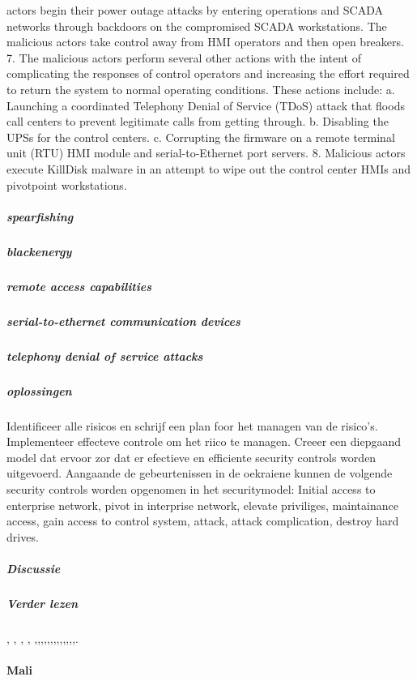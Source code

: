 actors begin their power outage attacks by entering
operations and SCADA networks through backdoors on
the compromised SCADA workstations. The malicious
actors take control away from HMI operators and then
open breakers.
7. The malicious actors perform several other actions with
the intent of complicating the responses of control
operators and increasing the effort required to return the
system to normal operating conditions. These actions
include:
a. Launching a coordinated Telephony Denial of
Service (TDoS) attack that floods call centers to
prevent legitimate calls from getting through.
b. Disabling the UPSs for the control centers.
c. Corrupting the firmware on a remote terminal unit
(RTU) HMI module and serial-to-Ethernet port
servers.
8. Malicious actors execute KillDisk malware in an
attempt to wipe out the control center HMIs and pivotpoint workstations.
\cite{Whitehead2017ukrainepoweroutage}
\cite{boozallen2016lightwentout}
\subparagraph{spearfishing}
\subparagraph{blackenergy}
\subparagraph{remote access capabilities}
\subparagraph{serial-to-ethernet communication devices}
\subparagraph{telephony denial of service attacks}
\subparagraph{oplossingen}
Identificeer alle risicos en schrijf een plan foor het managen van de risico's.
Implementeer  effecteve controle  om het riico te managen.
Creeer een diepgaand model dat ervoor zor dat er efectieve en efficiente security controls worden uitgevoerd.
Aangaande de gebeurtenissen in de oekraiene kunnen de volgende security controls worden opgenomen in het securitymodel: Initial access to enterprise network, pivot in interprise network, elevate priviliges, maintainance access, gain access to control system, attack, attack complication, destroy hard drives.
\cite{Whitehead2017ukrainepoweroutage}
\subparagraph{Discussie}
\subparagraph{Verder lezen}
\cite{shahzad2014ScadaProtocolsPollingScenario},
\cite{grammatikis2019AttackIEC6087505104},
\cite{2017win32industroyer},
\cite{yadav2020reviewScadaArchitecture},
\cite{arrizabalaga2020surveyiiotProtocols},\cite{fauri2017EncryptionICS},\cite{resch31102019IEC62351secureCommunication},\cite{levalle2020FuzzingICSProtocols},\cite{blackhatusa2017},\cite{blackhatusa2017},\cite{abb30062017crashoverridenotification},\cite{spinner2018crashoverrideiot},\cite{njccicthreat08102017crashovverrideprofile},\cite{slowikvb2018crashoverride},\cite{crashoverridenetwork},\cite{wikiindustroyer},\cite{icsSecurityRussianHacking},\cite{holappa2017threattoElectricityNetworks}.

 


\paragraph{Mali}

